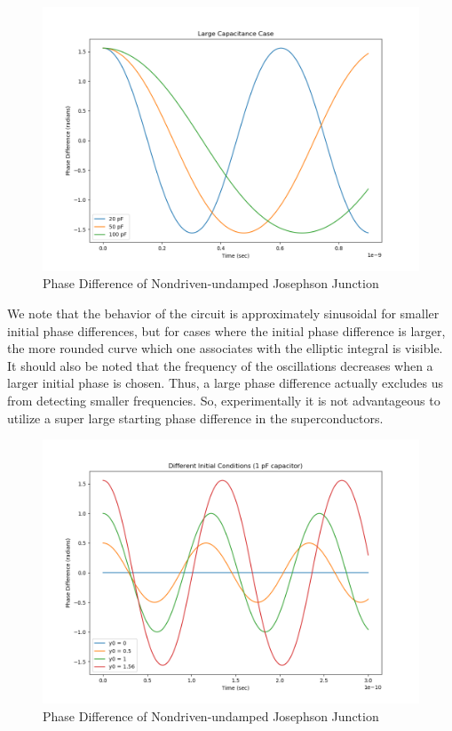 \documentclass[12pt]{article}
\begin{document}
\begin{figure}
\caption{Phase Difference of Nondriven-undamped Josephson Junction}
\begin{center}
\includegraphics[scale=0.50]{uud-jjlargec.png}
\end{center}
\end{figure}


We note that the behavior of the circuit is approximately sinusoidal for smaller initial phase differences, but for cases where the initial phase difference is larger, the more rounded curve which one associates with the elliptic integral is visible.  It should also be noted that the frequency of the oscillations decreases when a larger initial phase is chosen.  Thus, a large phase difference actually excludes us from detecting smaller frequencies.  So, experimentally it is not advantageous to utilize a super large starting phase difference in the superconductors.

\begin{figure}
\caption{Phase Difference of Nondriven-undamped Josephson Junction}
\begin{center}
\includegraphics[scale=0.50]{uud-jjinit.png}
\end{center}
\end{figure}
\end{document}
